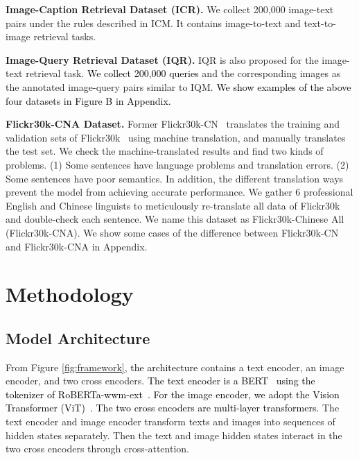 \documentclass[sigconf]{acmart}
\def\blue{\textcolor{black}}
\def\mmxie{\textcolor{black}}
\def\mmcr{\textcolor{black}}
\begin{document}
\textbf{Image-Caption Retrieval Dataset (ICR).} 
{We collect 200,000 image-text pairs under the rules described in ICM. It contains image-to-text and text-to-image retrieval tasks.}


\textbf{Image-Query Retrieval Dataset (IQR).} IQR is also proposed for the image-text retrieval task. \blue{We collect 200,000 queries} and the corresponding images as the annotated image-query pairs similar to IQM. 
\mmxie{We show examples of the above four datasets in \mmcr{Figure B in Appendix.}}


\textbf{Flickr30k-CNA Dataset.}
Former Flickr30k-CN~\cite{flickr30k-cn} translates the training and validation sets of Flickr30k~\cite{Flickr} using machine translation, and manually translates the test set.
We check the machine-translated results and find two kinds of problems. (1) Some sentences have language problems and translation errors. (2) Some sentences have poor semantics. 
In addition, the different translation ways prevent the model from achieving accurate performance.
We gather 6 professional English and Chinese linguists to meticulously re-translate all data of Flickr30k and double-check each sentence.
We name this dataset as Flickr30k-Chinese All (Flickr30k-CNA). 
We show some cases of the difference between Flickr30k-CN and Flickr30k-CNA in Appendix.




\section{Methodology}\label{approach}



\subsection{Model Architecture}\label{sec model}
From Figure \ref{fig:framework}, \blue{the architecture} contains a text encoder, an image encoder, and two cross encoders.
\blue{The text encoder is a BERT~\cite{bert} using the tokenizer of RoBERTa-wwm-ext~\cite{chinesebert}. For the image encoder, we adopt the Vision Transformer (ViT)~\cite{vit}. The two cross encoders are multi-layer transformers.}
The text encoder and image encoder transform texts and images into sequences of hidden states separately.
Then the text and image hidden states interact in the two cross encoders through cross-attention.
\end{document}
